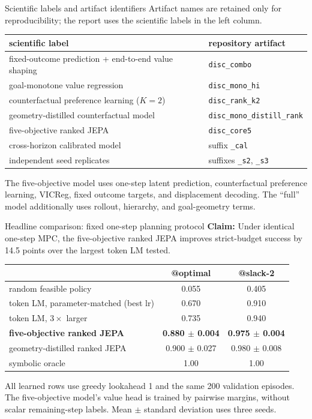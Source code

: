 \documentclass[aspectratio=169,10pt]{beamer}
\newcommand{\claim}[1]{\textcolor{cviolet}{\textbf{Claim:} #1}}
\begin{document}
\begin{frame}{Scientific labels and artifact identifiers}
\small
Artifact names are retained only for reproducibility; the report uses the
scientific labels in the left column.
\medskip
\centering
\begin{tabular}{p{}p{}}
\toprule
scientific label & repository artifact\\
\midrule
fixed-outcome prediction + end-to-end value shaping & \texttt{disc\_combo}\\
goal-monotone value regression & \texttt{disc\_mono\_hi}\\
counterfactual preference learning ($K=2$) & \texttt{disc\_rank\_k2}\\
geometry-distilled counterfactual model & \texttt{disc\_mono\_distill\_rank}\\
five-objective ranked JEPA & \texttt{disc\_core5}\\
cross-horizon calibrated model & suffix \texttt{\_cal}\\
independent seed replicates & suffixes \texttt{\_s2}, \texttt{\_s3}\\
\bottomrule
\end{tabular}

\medskip
The five-objective model uses one-step latent prediction, counterfactual
preference learning, VICReg, fixed outcome targets, and displacement decoding.
The ``full'' model additionally uses rollout, hierarchy, and goal-geometry terms.
\end{frame}

\begin{frame}{Headline comparison: fixed one-step planning protocol}
\claim{Under identical one-step MPC, the five-objective ranked JEPA improves
strict-budget success by 14.5 points over the largest token LM tested.}
\centering\small
\begin{tabular}{lcc}
\toprule
 & @optimal & @slack-2\\
\midrule
random feasible policy & 0.055 & 0.405\\
token LM, parameter-matched (best lr) & 0.670 & 0.910\\
token LM, $3\times$ larger & 0.735 & 0.940\\
\textbf{five-objective ranked JEPA} & \textbf{0.880 $\pm$ 0.004}
 & \textbf{0.975 $\pm$ 0.004}\\
geometry-distilled ranked JEPA & 0.900 $\pm$ 0.027 & 0.980 $\pm$ 0.008\\
symbolic oracle & 1.00 & 1.00\\
\bottomrule
\end{tabular}

\medskip
All learned rows use greedy lookahead 1 and the same 200 validation episodes.
The five-objective model's value head is trained by pairwise margins, without
scalar remaining-step labels. Mean $\pm$ standard deviation uses three seeds.
\end{frame}
\end{document}
